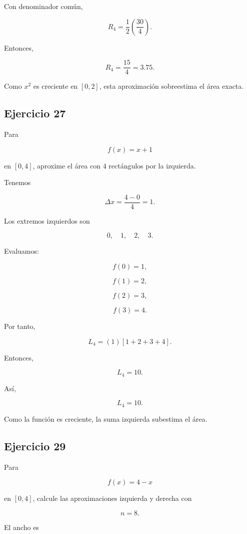 \documentclass[12pt]{article}
\begin{document}
Con denominador común,

\[
R_4
=
\frac12
\left(
\frac{30}{4}
\right).
\]

Entonces,

\[
\boxed{
R_4=\frac{15}{4}=3.75
}.
\]

Como \(x^2\) es creciente en \([0,2]\), esta aproximación sobreestima el
área exacta.

\subsection*{Ejercicio 27}

Para

\[
f(x)=x+1
\]

en \([0,4]\), aproxime el área con \(4\) rectángulos por la izquierda.

Tenemos

\[
\Delta x=
\frac{4-0}{4}=1.
\]

Los extremos izquierdos son

\[
0,\quad1,\quad2,\quad3.
\]

Evaluamos:

\[
f(0)=1,
\]

\[
f(1)=2,
\]

\[
f(2)=3,
\]

\[
f(3)=4.
\]

Por tanto,

\[
L_4
=
(1)
\left[
1+2+3+4
\right].
\]

Entonces,

\[
L_4=10.
\]

Así,

\[
\boxed{L_4=10}.
\]

Como la función es creciente, la suma izquierda subestima el área.

\subsection*{Ejercicio 29}

Para

\[
f(x)=4-x
\]

en \([0,4]\), calcule las aproximaciones izquierda y derecha con

\[
n=8.
\]

El ancho es
\end{document}
